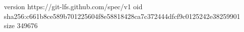 version https://git-lfs.github.com/spec/v1
oid sha256:c661b8ce589b701225604f8e58818428ca7c372444dfcf9c0125242e38259901
size 349676
